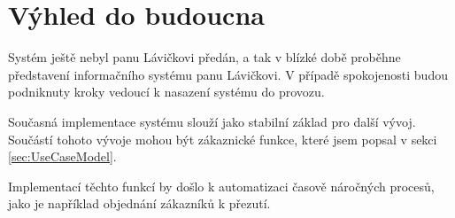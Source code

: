 \section{Výhled do budoucna}
Systém ještě nebyl panu Lávičkovi předán, a tak v blízké době proběhne představení informačního systému panu Lávičkovi. V případě spokojenosti budou podniknuty kroky vedoucí k nasazení systému do provozu.

Současná implementace systému slouží jako stabilní základ pro další vývoj. Součástí tohoto vývoje mohou být zákaznické funkce, které jsem popsal v sekci \ref{sec:UseCaseModel}.

Implementací těchto funkcí by došlo k automatizaci časově náročných procesů, jako je například objednání zákazníků k přezutí.
